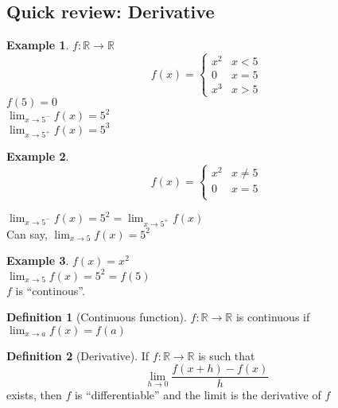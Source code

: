 \documentclass[twocolumn,20pt,fleqn]{extarticle}
\theoremstyle{plain}
\theoremstyle{definition}
\newtheorem*{definition}{Definition}
\newtheorem*{example}{Example}
\theoremstyle{remark}
\begin{document}
\subsection{Quick review: Derivative}
\begin{example}
  $f : \mathbb{R}\to \mathbb{R}$
  \[f(x) =
      \begin{cases}
        x^2 & x < 5\\
        0 & x = 5\\
        x^3 & x > 5
      \end{cases}
      \]
      $f(5)=0$\\
$\displaystyle\lim_{x \to 5^-} f(x)  = 5^2$\\
$\displaystyle\lim_{x \to 5^+} f(x)  = 5^3$
\end{example}


\begin{example}
  \[f(x) =
      \begin{cases}
        x^2 & x  \neq  5\\
        0 & x = 5\\
        
      \end{cases}
      \]
      
      


$\displaystyle\lim_{x \to 5^-} f(x) = 5^2  = \displaystyle\lim_{x \to 5^+} f(x)$\\
Can say, $\displaystyle\lim_{x \to 5} f(x) = 5^2$
\end{example}

\newpage
\begin{example}
$f(x) = x^2$\\
$\displaystyle\lim_{x \to 5} f(x) = 5^2 = f(5)$\\
$f$ is ``continous''.
\end{example}

\begin{definition}[Continuous function]
$f : \mathbb{R} \to \mathbb{R}$ is continuous if $\displaystyle\lim_{x \to a} f(x) = f(a)$
\end{definition}

\begin{definition}[Derivative]
  If $f : \mathbb{R}\to \mathbb{R}$ is such that
  \[\displaystyle\lim_{h\to 0}\frac{f(x+h) - f(x)}{h}\] exists, then $f$ is ``differentiable'' and the limit is the derivative of $f$\end{definition}


\clearpage
\end{document}
